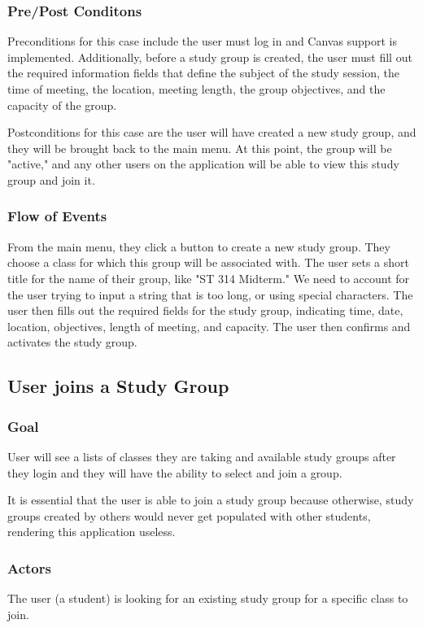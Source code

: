 \documentclass[12pt,letterpaper]{article}
\begin{document}
\subsubsection{Pre/Post Conditons}
Preconditions for this case include the user must log in and Canvas support is implemented. Additionally, before a study group is created, the user must fill out the required information fields that define the subject of the study session, the time of meeting, the location, meeting length, the group objectives, and the capacity of the group.

Postconditions for this case are the user will have created a new study group, and they will be brought back to the main menu. At this point, the group will be "active," and any other users on the application will be able to view this study group and join it.

\subsubsection{Flow of Events}
From the main menu, they click a button to create a new study group. They choose a class for which this group will be associated with. The user sets a short title for the name of their group, like "ST 314 Midterm." We need to account for the user trying to input a string that is too long, or using special characters. The user then fills out the required fields for the study group, indicating time, date, location, objectives, length of meeting, and capacity. The user then confirms and activates the study group. 

\subsection{User joins a Study Group}
\subsubsection{Goal}
User will see a lists of classes they are taking and available study groups after they login and they will have the ability to select and join a group.

It is essential that the user is able to join a study group because  otherwise, study groups created by others would never get populated with other students, rendering this application useless. 

\subsubsection{Actors}
The user (a student) is looking for an existing study group for a specific class to join.
\end{document}
